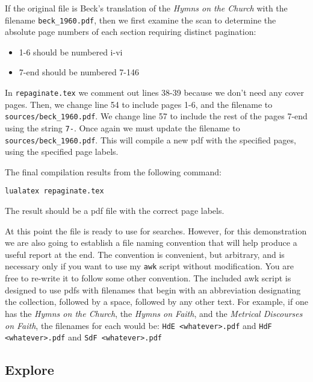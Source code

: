 \documentclass[
  letterpaper,
]{tufte-handout}
\providecommand{\tightlist}{%
  \setlength{\itemsep}{0pt}\setlength{\parskip}{0pt}}
\begin{document}
If the original file is Beck's translation of the \emph{Hymns on the
Church} with the filename \texttt{beck_1960.pdf}, then we
first examine the scan to determine the absolute page numbers of each
section requiring distinct pagination:

\begin{itemize}
\tightlist
\item
  1-6 should be numbered i-vi
\item
  7-end should be numbered 7-146
\end{itemize}

In \texttt{repaginate.tex} we comment out lines 38-39
because we don't need any cover pages. Then, we change line 54 to
include pages 1-6, and the filename to
\texttt{sources/beck_1960.pdf}. We change line 57 to include
the rest of the pages 7-end using the string \texttt{7-}.
Once again we must update the filename to
\texttt{sources/beck_1960.pdf}. This will compile a new pdf
with the specified pages, using the specified page labels.

The final compilation results from the following command:

\begin{verbatim}
lualatex repaginate.tex
\end{verbatim}

The result should be a pdf file with the correct page labels.

At this point the file is ready to use for searches. However, for this
demonstration we are also going to establish a file naming convention
that will help produce a useful report at the end. The convention is
convenient, but arbitrary, and is necessary only if you want to use my
\texttt{awk} script without modification. You are free to
re-write it to follow some other convention. The included awk script is
designed to use pdfs with filenames that begin with an abbreviation
designating the collection, followed by a space, followed by any other
text. For example, if one has the \emph{Hymns on the Church}, the
\emph{Hymns on Faith}, and the \emph{Metrical Discourses on Faith}, the
filenames for each would be: \texttt{HdE <whatever>.pdf} and
\texttt{HdF <whatever>.pdf} and
\texttt{SdF <whatever>.pdf}

\subsection{Explore}\label{explore}
\end{document}

